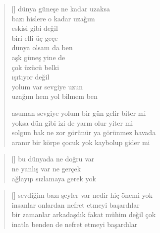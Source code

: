 \documentclass[10pt, openright, twoside]{memoir}
\theoremstyle{definition}
\begin{document}
\vspace*{\fill}
%
\newpage
{}
\vspace*{\fill}
\settowidth{\versewidth}{solgun bak ne zor görünür ya görünmez havada}
\begin{verse}[\versewidth]
  dünya güneşe ne kadar uzaksa \\
  bazı hislere o kadar uzağım \\
  eskisi gibi değil \\
  biri elli üç geçe \\
  dünya olsam da ben \\
  aşk güneş yine de \\
  çok üzücü belki \\
  ışıtıyor değil \\
  yolum var sevgiye uzun \\
  uzağım hem yol bilmem ben

  asuman sevgiye yolum bir gün gelir biter mi \\
  yoksa dün gibi izi de yarın olur yiter mi \\
  solgun bak ne zor görünür ya görünmez havada \\
  aranır bir körpe çocuk yok kaybolup gider mi
\end{verse}
\vspace*{\fill}
%
\newpage
{}
\vspace*{\fill}
\settowidth{\versewidth}{ağlayıp sızlamaya gerek yok}
\begin{verse}[\versewidth]
  bu dünyada ne doğru var \\
  ne yanlış var ne gerçek \\
  ağlayıp sızlamaya gerek yok
\end{verse}
\vspace*{\fill}
%
\newpage
{}
\vspace*{\fill}
\settowidth{\versewidth}{bir zamanlar arkadaşdık fakat mühim değil çok}
\begin{verse}[\versewidth]
  sevdiğim bazı şeyler var nedir hiç önemi yok \\
  insanlar onlardan nefret etmeyi başardılar \\
  bir zamanlar arkadaşdık fakat mühim değil çok \\
  inatla benden de nefret etmeyi başardılar
\end{verse}
\vspace*{\fill}
\end{document}
